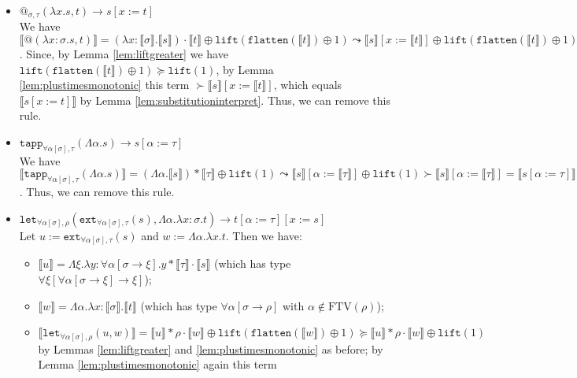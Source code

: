 \documentclass[runningheads,a4paper]{llncs}
\newcommand{\quant}[2]{\forall #1[#2]}
\newcommand{\qquant}[3]{#1 #2[#3]}
\newcommand{\typeinterpret}[1]{\llbracket #1 \rrbracket}
\newcommand{\interpret}[1]{\llbracket #1 \rrbracket}
\newcommand{\red}{\longrightarrow}
\newcommand{\arrtype}{\rightarrow}
\newcommand{\abs}[2]{\lambda #1.#2}
\newcommand{\tabs}[2]{\Lambda #1.#2}
\newcommand{\FTV}{\mathrm{FTV}}
\newcommand{\flatten}{\mathtt{flatten}}
\newcommand{\lift}{\mathtt{lift}}
\begin{document}
\begin{itemize}
\item $@_{\sigma,\tau}(\abs{x}{s},t) \red s[x:=t]$ \\
  We have $\interpret{@(\abs{x:\sigma}{s},t)} = (\abs{x:\typeinterpret{
  \sigma}}{\interpret{s}}) \cdot \interpret{t} \oplus \lift(\flatten(
  \interpret{t}) \oplus 1) \leadsto \interpret{s}[x:=\interpret{t}]
  \oplus \lift(\flatten(\interpret{t}) \oplus 1)$.  Since, by Lemma
  \ref{lem:liftgreater} we have $\lift(\flatten(\interpret{t}) \oplus
  1) \succeq \lift(1)$, by Lemma \ref{lem:plustimesmonotonic} this term
  $\succ \interpret{s}[x:=\interpret{t}]$, which equals
  $\interpret{s[x:=t]}$ by Lemma \ref{lem:substitutioninterpret}.
  Thus, we can remove this rule.
\item $\mathtt{tapp}_{\quant{\alpha}{\sigma},\tau}(\tabs{\alpha}{s})
  \red s[\alpha:=\tau]$ \\ We have
  $\interpret{\mathtt{tapp}_{\quant{\alpha}{\sigma},
      \tau}(\tabs{\alpha}{s})} = (\tabs{\alpha}{\interpret{s}}) *
  \typeinterpret{\tau} \oplus \lift(1) \leadsto \interpret{s}[\alpha:=
    \typeinterpret{\tau}] \oplus \lift(1) \succ
  \interpret{s}[\alpha:=\typeinterpret{\tau}] =
  \interpret{s[\alpha:=\tau]}$.  Thus, we can remove this rule.
\item $\mathtt{let}_{\qquant{\forall}{\alpha}{\sigma},\rho}(
  \mathtt{ext}_{\qquant{\forall}{\alpha}{\sigma},\tau}(s),\tabs{\alpha}{
    \abs{x:\sigma}{t}}) \red t[\alpha:=\tau][x:=s]$ \\
  Let $u := \mathtt{ext}_{\quant{\alpha}{\sigma},\tau}(s)$ and
  $w := \tabs{\alpha}{\abs{x}{t}}$.  Then we have:
  \begin{itemize}
  \item $\interpret{u} =
    \tabs{\xi}{\abs{y:\quant{\alpha}{\sigma \arrtype \xi}}{
    y * \typeinterpret{\tau} \cdot \interpret{s}}}$ (which has type
    $\quant{\xi}{\quant{\alpha}{\sigma \arrtype \xi} \arrtype \xi}$);
  \item $\interpret{w} = \tabs{\alpha}{\abs{x:\typeinterpret{\sigma}}{
    \interpret{t}}}$ (which has type $\quant{\alpha}{\sigma \arrtype
    \rho}$ with $\alpha \notin \FTV(\rho)$);
  \item $\interpret{\mathtt{let}_{\quant{\alpha}{\sigma},\rho}(u,w)} =
    \interpret{u} * \rho \cdot \interpret{w} \oplus
    \lift(\flatten(\interpret{w})\oplus 1) \succeq
    \interpret{u} * \rho \cdot \interpret{w} \oplus \lift(1)$ by
    Lemmas \ref{lem:liftgreater} and \ref{lem:plustimesmonotonic} as
    before; by Lemma \ref{lem:plustimesmonotonic} again this term

\end{itemize}
\end{itemize}
\end{document}
